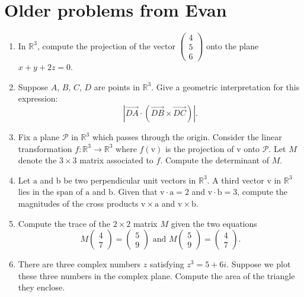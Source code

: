 \documentclass[11pt]{amsart}
\begin{document}
\section{Older problems from Evan}
\begin{enumerate}
\item
In \({\mathbb{R}}^{3}\), compute the projection of the vector
\(\begin{pmatrix}
4 \\
5 \\
6
\end{pmatrix}\) onto the plane \(x + y + 2z = 0\).
\item
Suppose \(A\), \(B\), \(C\), \(D\) are points in \({\mathbb{R}}^{3}\).
Give a geometric interpretation for this expression:
\[|\overset{\rightarrow}{DA} \cdot \left( \overset{\rightarrow}{DB} \times \overset{\rightarrow}{DC} \right)|.\]
\item
Fix a plane \(\mathcal{P}\) in \({\mathbb{R}}^{3}\) which passes through
the origin. Consider the linear transformation
\(f:{\mathbb{R}}^{3} \rightarrow {\mathbb{R}}^{3}\) where
\(f\left( \mathbf{\mathrm{v}} \right)\) is the projection of
\(\mathbf{\mathrm{v}}\) onto \(\mathcal{P}\). Let \(M\) denote the
\(3 \times 3\) matrix associated to \(f\). Compute the determinant of
\(M\).
\item
Let \(\mathbf{\mathrm{a}}\) and \(\mathbf{\mathrm{b}}\) be two
perpendicular unit vectors in \({\mathbb{R}}^{3}\). A third vector
\(\mathbf{\mathrm{v}}\) in \({\mathbb{R}}^{3}\) lies in the span of
\(\mathbf{\mathrm{a}}\) and \(\mathbf{\mathrm{b}}\). Given that
\(\mathbf{\mathrm{v}} \cdot \mathbf{\mathrm{a}} = 2\) and
\(\mathbf{\mathrm{v}} \cdot \mathbf{\mathrm{b}} = 3\), compute the
magnitudes of the cross products
\(\mathbf{\mathrm{v}} \times \mathbf{\mathrm{a}}\) and
\(\mathbf{\mathrm{v}} \times \mathbf{\mathrm{b}}\).
\item
Compute the trace of the \(2 \times 2\) matrix \(M\) given the two
equations \[M\begin{pmatrix}
4 \\
7
\end{pmatrix} = \begin{pmatrix}
5 \\
9
\end{pmatrix}\text{  and  }M\begin{pmatrix}
5 \\
9
\end{pmatrix} = \begin{pmatrix}
4 \\
7
\end{pmatrix}.\]
\item
There are three complex numbers \(z\) satisfying \(z^{3} = 5 + 6i\).
Suppose we plot these three numbers in the complex plane. Compute the
area of the triangle they enclose.
\end{enumerate}
\end{document}
